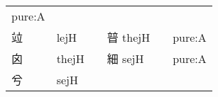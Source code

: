 \documentclass[14pt,a4paper]{scrartcl}
\begin{document}
\begin{longtable}[c]{@{}llllll@{}}
\begin{minipage}[t]{0.14\columnwidth}
pure:A
\strut\end{minipage}\tabularnewline
\begin{minipage}[t]{0.14\columnwidth}\raggedright\strut
竝
\strut\end{minipage} &
\begin{minipage}[t]{0.14\columnwidth}\raggedright\strut
lejH
\strut\end{minipage} &
\begin{minipage}[t]{0.14\columnwidth}\raggedright\strut
\strut\end{minipage} &
\begin{minipage}[t]{0.14\columnwidth}\raggedright\strut
暜 thejH
\strut\end{minipage} &
\begin{minipage}[t]{0.14\columnwidth}\raggedright\strut
\strut\end{minipage} &
\begin{minipage}[t]{0.14\columnwidth}\raggedright\strut
pure:A
\strut\end{minipage}\tabularnewline
\begin{minipage}[t]{0.14\columnwidth}\raggedright\strut
囟
\strut\end{minipage} &
\begin{minipage}[t]{0.14\columnwidth}\raggedright\strut
thejH
\strut\end{minipage} &
\begin{minipage}[t]{0.14\columnwidth}\raggedright\strut
\strut\end{minipage} &
\begin{minipage}[t]{0.14\columnwidth}\raggedright\strut
細 sejH
\strut\end{minipage} &
\begin{minipage}[t]{0.14\columnwidth}\raggedright\strut
\strut\end{minipage} &
\begin{minipage}[t]{0.14\columnwidth}\raggedright\strut
pure:A
\strut\end{minipage}\tabularnewline
\begin{minipage}[t]{0.14\columnwidth}\raggedright\strut
兮
\strut\end{minipage} &
\begin{minipage}[t]{0.14\columnwidth}\raggedright\strut
sejH
\strut\end{minipage} &
\begin{minipage}[t]{0.14\columnwidth}\raggedright\strut
\strut\end{minipage} &
\begin{minipage}[t]{0.14\columnwidth}\raggedright\strut

\end{minipage}
\end{longtable}
\end{document}
